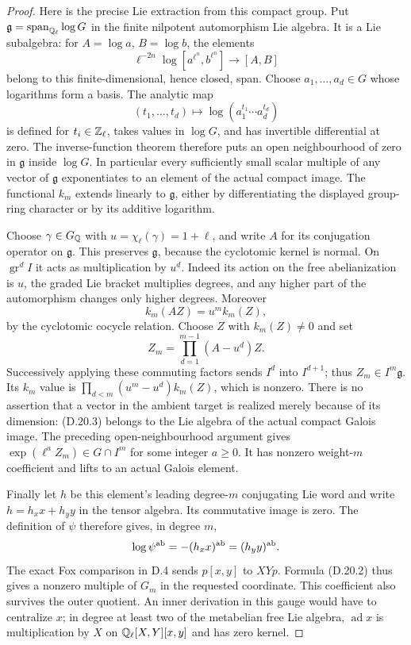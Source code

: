 \begin{proof}
Here is the precise Lie extraction from this compact
group. Put $\mathfrak g=\operatorname{span}_{\mathbb Q_\ell}\log G$
in the finite nilpotent automorphism Lie algebra. It is
a Lie subalgebra: for $A=\log a$, $B=\log b$, the elements
\[
 \ell^{-2n}\log[a^{\ell^n},b^{\ell^n}]
                       \longrightarrow[A,B]
\]
belong to this finite-dimensional, hence closed, span.
Choose $a_1,\ldots,a_d\in G$ whose logarithms form a
basis. The analytic map
\[
 (t_1,\ldots,t_d)\longmapsto
       \log(a_1^{t_1}\cdots a_d^{t_d})
\]
is defined for $t_i\in\mathbb Z_\ell$, takes values in
$\log G$, and has invertible differential at zero.
The inverse-function theorem therefore puts an open
neighbourhood of zero in $\mathfrak g$ inside $\log G$.
In particular every sufficiently small scalar multiple
of any vector of $\mathfrak g$ exponentiates to an
element of the actual compact image. The functional
$k_m$ extends linearly to $\mathfrak g$, either by
differentiating the displayed group-ring character or
by its additive logarithm.

Choose $\gamma\in G_\mathbb Q$ with
$u=\chi_\ell(\gamma)=1+\ell$, and write $A$ for its
conjugation operator on $\mathfrak g$. This preserves
$\mathfrak g$, because the cyclotomic kernel is normal.
On $\operatorname{gr}^d I$ it acts as multiplication by
$u^d$. Indeed its action on the free abelianization is
$u$, the graded Lie bracket multiplies degrees, and
any higher part of the automorphism changes only
higher degrees. Moreover
\[
                  k_m(AZ)=u^m k_m(Z),
\]
by the cyclotomic cocycle relation. Choose $Z$ with
$k_m(Z)\ne0$ and set
\[
                 Z_m=\prod_{d=1}^{m-1}(A-u^d)Z.
 \tag{D.20.3}
\]
Successively applying these commuting factors sends
$I^d$ into $I^{d+1}$; thus $Z_m\in I^m\mathfrak g$.
Its $k_m$ value is
$\prod_{d<m}(u^m-u^d)k_m(Z)$, which is nonzero.
There is no assertion that a vector in the ambient
target is realized merely because of its dimension:
(D.20.3) belongs to the Lie algebra of the actual
compact Galois image. The preceding open-neighbourhood
argument gives $\exp(\ell^a Z_m)\in G\cap I^m$ for
some integer $a\ge0$. It has nonzero weight-$m$
coefficient and lifts to an actual Galois element.

Finally let $h$ be this element's leading degree-$m$
conjugating Lie word and write $h=h_xx+h_yy$ in the
tensor algebra. Its commutative image is zero. The
definition of $\psi$ therefore gives, in degree $m$,
\[
 \log\psi^{\rm ab}=-(h_xx)^{\rm ab}
                      =(h_yy)^{\rm ab}.
\]
The exact Fox comparison in D.4 sends $p[x,y]$ to
$XYp$. Formula (D.20.2) thus gives a nonzero multiple
of $G_m$ in the requested coordinate. This coefficient
also survives the outer quotient. An inner derivation
in this gauge would have to centralize $x$; in degree
at least two of the metabelian free Lie algebra,
$\operatorname{ad}x$ is multiplication by $X$ on
$\mathbb Q_\ell[X,Y][x,y]$ and has zero kernel.


\end{proof}
